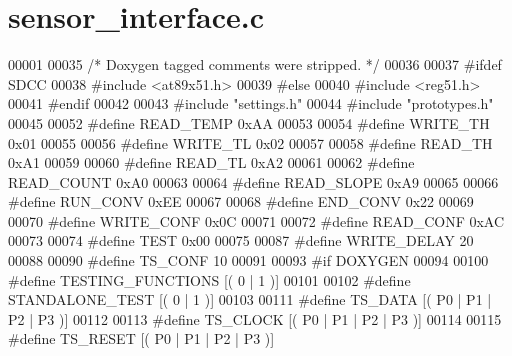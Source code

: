 \section{sensor\_\-interface.c}

\begin{DoxyCode}
00001 
00035 \textcolor{comment}{/* Doxygen tagged comments were stripped. */}
00036 
00037 \textcolor{preprocessor}{#ifdef SDCC}
00038 \textcolor{preprocessor}{}\textcolor{preprocessor}{#include <at89x51.h>}
00039 \textcolor{preprocessor}{#else}
00040 \textcolor{preprocessor}{}\textcolor{preprocessor}{#include <reg51.h>}
00041 \textcolor{preprocessor}{#endif}
00042 \textcolor{preprocessor}{}
00043 \textcolor{preprocessor}{#include "settings.h"}
00044 \textcolor{preprocessor}{#include "prototypes.h"}
00045 
00052 \textcolor{preprocessor}{#define READ\_TEMP  0xAA         }
00053 \textcolor{preprocessor}{}
00054 \textcolor{preprocessor}{#define WRITE\_TH   0x01}
00055 \textcolor{preprocessor}{}
00056 \textcolor{preprocessor}{#define WRITE\_TL   0x02 }
00057 \textcolor{preprocessor}{}
00058 \textcolor{preprocessor}{#define READ\_TH    0xA1 }
00059 \textcolor{preprocessor}{}
00060 \textcolor{preprocessor}{#define READ\_TL    0xA2 }
00061 \textcolor{preprocessor}{}
00062 \textcolor{preprocessor}{#define READ\_COUNT 0xA0 }
00063 \textcolor{preprocessor}{}
00064 \textcolor{preprocessor}{#define READ\_SLOPE 0xA9 }
00065 \textcolor{preprocessor}{}
00066 \textcolor{preprocessor}{#define RUN\_CONV 0xEE   }
00067 \textcolor{preprocessor}{}
00068 \textcolor{preprocessor}{#define END\_CONV  0x22  }
00069 \textcolor{preprocessor}{}
00070 \textcolor{preprocessor}{#define WRITE\_CONF 0x0C }
00071 \textcolor{preprocessor}{}
00072 \textcolor{preprocessor}{#define READ\_CONF  0xAC }
00073 \textcolor{preprocessor}{}
00074 \textcolor{preprocessor}{#define TEST 0x00}
00075 \textcolor{preprocessor}{}
00087 \textcolor{preprocessor}{#define WRITE\_DELAY 20  }
00088 \textcolor{preprocessor}{}
00090 \textcolor{preprocessor}{#define TS\_CONF 10}
00091 \textcolor{preprocessor}{}
00093 \textcolor{preprocessor}{#if DOXYGEN}
00094 \textcolor{preprocessor}{}
00100 \textcolor{preprocessor}{#define TESTING\_FUNCTIONS       [( 0 | 1 )]}
00101 \textcolor{preprocessor}{}
00102 \textcolor{preprocessor}{#define STANDALONE\_TEST         [( 0 | 1 )]}
00103 \textcolor{preprocessor}{}
00111 \textcolor{preprocessor}{#define TS\_DATA  [( P0 | P1 | P2 | P3 )]}
00112 \textcolor{preprocessor}{}
00113 \textcolor{preprocessor}{#define TS\_CLOCK [( P0 | P1 | P2 | P3 )]}
00114 \textcolor{preprocessor}{}
00115 \textcolor{preprocessor}{#define TS\_RESET [( P0 | P1 | P2 | P3 )]}

\end{DoxyCode}
